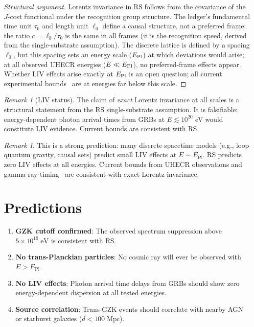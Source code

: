 \documentclass[12pt,a4paper]{article}
\theoremstyle{definition}
\theoremstyle{remark}
\newtheorem{remark}[theorem]{Remark}
\begin{document}
\begin{proof}[Structural argument]
Lorentz invariance in RS follows from the covariance of the
$J$-cost functional under the recognition group structure.  The
ledger's fundamental time unit $\tau_0$ and length unit $\ell_0$
define a causal structure, not a preferred frame: the ratio
$c = \ell_0/\tau_0$ is the same in all frames (it is the
recognition speed, derived from the single-substrate assumption).
The discrete lattice is defined by a spacing $\ell_0$, but this
spacing sets an energy scale ($E_{\rm Pl}$) at which deviations
would arise; at all observed UHECR energies ($E \ll E_{\rm Pl}$),
no preferred-frame effects appear.  Whether LIV effects arise
exactly at $E_{\rm Pl}$ is an open question; all current
experimental bounds~\cite{Vasileiou2013} are at energies far
below this scale.
\end{proof}

\begin{remark}[LIV status]
The claim of \emph{exact} Lorentz invariance at all scales is
a structural statement from the RS single-substrate assumption.
It is falsifiable: energy-dependent photon arrival times from
GRBs at $E \lesssim 10^{20}$ eV would constitute LIV evidence.
Current bounds are consistent with RS.
\end{remark}

\begin{remark}
This is a strong prediction: many discrete spacetime models (e.g.,
loop quantum gravity, causal sets) predict small LIV effects at
$E \sim E_{\mathrm{Pl}}$.  RS predicts zero LIV effects at all
energies.  Current bounds from UHECR observations and gamma-ray
timing~\cite{Vasileiou2013} are consistent with exact Lorentz
invariance.
\end{remark}

\section{Predictions}
\label{sec:predictions}

\begin{enumerate}
  \item \textbf{GZK cutoff confirmed}: The observed spectrum
  suppression above $5 \times 10^{19}\;\mathrm{eV}$ is
  consistent with RS.

  \item \textbf{No trans-Planckian particles}: No cosmic ray will
  ever be observed with $E > E_{\mathrm{Pl}}$.

  \item \textbf{No LIV effects}: Photon arrival time delays from
  GRBs should show zero energy-dependent dispersion at all
  tested energies.

  \item \textbf{Source correlation}: Trans-GZK events should
  correlate with nearby AGN or starburst galaxies
  ($d < 100\;\mathrm{Mpc}$).
\end{enumerate}
\end{document}
